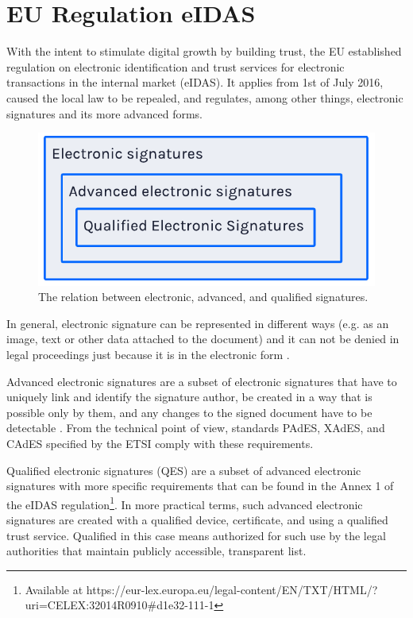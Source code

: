 \documentclass[a4paper,twocolumn]{article}
\begin{document}
\section{EU Regulation eIDAS}

With the intent to stimulate digital growth by building trust, the EU established regulation on electronic identification and trust services for electronic transactions in the internal market (eIDAS).
It applies from 1st of July 2016, caused the local law to be repealed, and regulates, among other things, electronic signatures and its more advanced forms.

\begin{figure}[ht]
    \includegraphics[width=\linewidth]{../paper/figures/electronic-advanced-qualified}
    \caption{The relation between electronic, advanced, and qualified signatures.}
    \centering
\end{figure}

In general, electronic signature can be represented in different ways (e.g. as an image, text or other data attached to the document) and it can not be denied in legal proceedings just because it is in the electronic form \cite{4}.

Advanced electronic signatures are a subset of electronic signatures that have to uniquely link and identify the signature author, be created in a way that is possible only by them, and any changes to the signed document have to be detectable \cite{5}.
From the technical point of view, standards PAdES, XAdES, and CAdES specified by the ETSI comply with these requirements.

Qualified electronic signatures (QES) are a subset of advanced electronic signatures with more specific requirements that can be found in the Annex 1 of the eIDAS regulation\footnote{Available at https://eur-lex.europa.eu/legal-content/EN/TXT/HTML/?uri=CELEX:32014R0910\#d1e32-111-1}.
In more practical terms, such advanced electronic signatures are created with a qualified device, certificate, and using a qualified trust service. Qualified in this case means authorized for such use by the legal authorities that maintain publicly accessible, transparent list.
\end{document}
